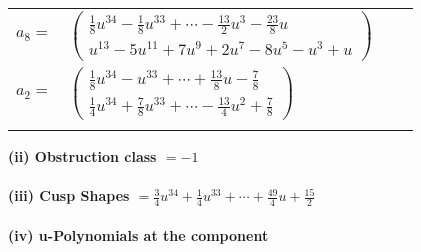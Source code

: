 \documentclass[1p]{elsarticle_modified}
\theoremstyle{definition}
\begin{document}
\begin{tabular}{m{7pt} m{180pt} m{7pt} m{180pt} }
\flushright $a_{8}=$&$\begin{pmatrix}\frac{1}{8} u^{34}-\frac{1}{8} u^{33}+\cdots-\frac{13}{2} u^3-\frac{23}{8} u\\u^{13}-5 u^{11}+7 u^9+2 u^7-8 u^5- u^3+u\end{pmatrix}$ \\
\flushright $a_{2}=$&$\begin{pmatrix}\frac{1}{8} u^{34}- u^{33}+\cdots+\frac{13}{8} u-\frac{7}{8}\\\frac{1}{4} u^{34}+\frac{7}{8} u^{33}+\cdots-\frac{13}{4} u^2+\frac{7}{8}\end{pmatrix}$\\&\end{tabular}
\flushleft \textbf{(ii) Obstruction class $= -1$}\\~\\
\flushleft \textbf{(iii) Cusp Shapes $= \frac{3}{4} u^{34}+\frac{1}{4} u^{33}+\cdots+\frac{49}{4} u+\frac{15}{2}$}\\~\\
\newpage\renewcommand{\arraystretch}{1}
\flushleft \textbf{(iv) u-Polynomials at the component}\newline \\
\end{document}
